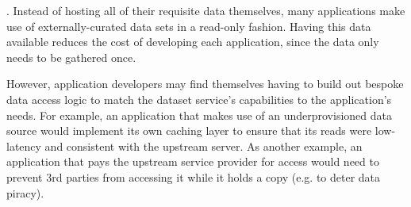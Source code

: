 .  Instead of hosting all
of their requisite data themselves, many applications make use of 
externally-curated data sets in a read-only fashion.  Having this data available
reduces the cost of developing each application, since the data only needs to be
gathered once.

However, application developers may find themselves having to 
build out bespoke data access logic to match the dataset service's capabilities
to the application's needs.  For example, an application that makes use
of an underprovisioned data source would implement its own caching layer to
ensure that its reads were low-latency and consistent with the upstream server.
As another example, an application that pays the upstream service provider for
access would need to prevent 3rd parties from accessing it while it holds a copy
(e.g. to deter data piracy).

